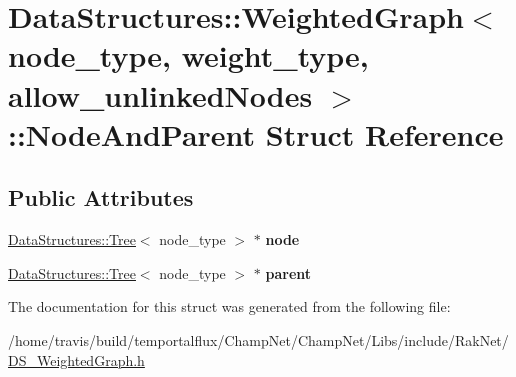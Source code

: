 \hypertarget{struct_data_structures_1_1_weighted_graph_1_1_node_and_parent}{\section{Data\-Structures\-:\-:Weighted\-Graph$<$ node\-\_\-type, weight\-\_\-type, allow\-\_\-unlinked\-Nodes $>$\-:\-:Node\-And\-Parent Struct Reference}
\label{struct_data_structures_1_1_weighted_graph_1_1_node_and_parent}
}
\subsection*{Public Attributes}
\begin{DoxyCompactItemize}
\item 
\hypertarget{struct_data_structures_1_1_weighted_graph_1_1_node_and_parent_a29bb0785f3cb3448280b17fe457e7ad1}{\hyperlink{class_data_structures_1_1_tree}{Data\-Structures\-::\-Tree}$<$ node\-\_\-type $>$ $\ast$ {\bfseries node}}\label{struct_data_structures_1_1_weighted_graph_1_1_node_and_parent_a29bb0785f3cb3448280b17fe457e7ad1}

\item 
\hypertarget{struct_data_structures_1_1_weighted_graph_1_1_node_and_parent_ac09b09f98e636f289ac435f0c9c46bc0}{\hyperlink{class_data_structures_1_1_tree}{Data\-Structures\-::\-Tree}$<$ node\-\_\-type $>$ $\ast$ {\bfseries parent}}\label{struct_data_structures_1_1_weighted_graph_1_1_node_and_parent_ac09b09f98e636f289ac435f0c9c46bc0}

\end{DoxyCompactItemize}


The documentation for this struct was generated from the following file\-:\begin{DoxyCompactItemize}
\item 
/home/travis/build/temportalflux/\-Champ\-Net/\-Champ\-Net/\-Libs/include/\-Rak\-Net/\hyperlink{_d_s___weighted_graph_8h}{D\-S\-\_\-\-Weighted\-Graph.\-h}\end{DoxyCompactItemize}
